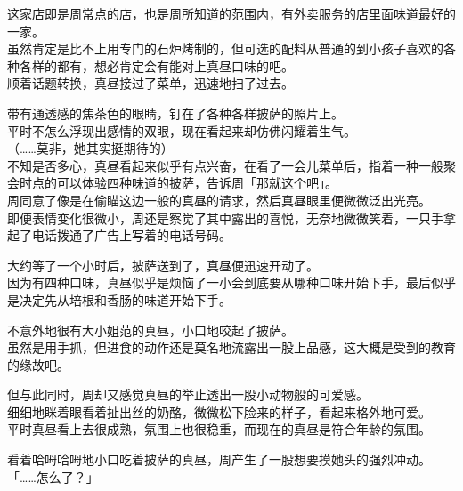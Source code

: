 这家店即是周常点的店，也是周所知道的范围内，有外卖服务的店里面味道最好的一家。\\

虽然肯定是比不上用专门的石炉烤制的，但可选的配料从普通的到小孩子喜欢的各种各样的都有，想必肯定会有能对上真昼口味的吧。\\

顺着话题转换，真昼接过了菜单，迅速地扫了过去。

带有通透感的焦茶色的眼睛，钉在了各种各样披萨的照片上。\\

平时不怎么浮现出感情的双眼，现在看起来却仿佛闪耀着生气。\\

（……莫非，她其实挺期待的）\\

不知是否多心，真昼看起来似乎有点兴奋，在看了一会儿菜单后，指着一种一般聚会时点的可以体验四种味道的披萨，告诉周「那就这个吧」。\\

周同意了像是在偷瞄这边一般的真昼的请求，然后真昼眼里便微微泛出光亮。\\

即便表情变化很微小，周还是察觉了其中露出的喜悦，无奈地微微笑着，一只手拿起了电话拨通了广告上写着的电话号码。\\

\vspace{2\baselineskip}

大约等了一个小时后，披萨送到了，真昼便迅速开动了。\\

因为有四种口味，真昼似乎是烦恼了一小会到底要从哪种口味开始下手，最后似乎是决定先从培根和香肠的味道开始下手。

不意外地很有大小姐范的真昼，小口地咬起了披萨。\\

虽然是用手抓，但进食的动作还是莫名地流露出一股上品感，这大概是受到的教育的缘故吧。

但与此同时，周却又感觉真昼的举止透出一股小动物般的可爱感。\\

细细地眯着眼看着扯出丝的奶酪，微微松下脸来的样子，看起来格外地可爱。\\

平时真昼看上去很成熟，氛围上也很稳重，而现在的真昼是符合年龄的氛围。

看着哈呣哈呣地小口吃着披萨的真昼，周产生了一股想要摸她头的强烈冲动。\\

「……怎么了？」


